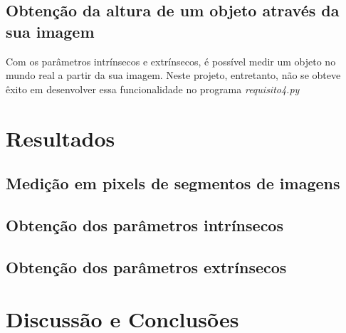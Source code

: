 \documentclass[conference]{IEEEtran}
\begin{document}
\subsection{Obtenção da altura de um objeto através da sua imagem}
Com os parâmetros intrínsecos e extrínsecos,  é possível medir um objeto no mundo real a partir da sua imagem. Neste projeto, entretanto, não se obteve êxito em desenvolver essa funcionalidade no programa \textit{requisito4.py}

\section{Resultados}
\subsection{Medição em pixels de segmentos de imagens}
\subsection{Obtenção dos parâmetros intrínsecos}
\subsection{Obtenção dos parâmetros extrínsecos}

\section{Discussão e Conclusões}




\end{document}
